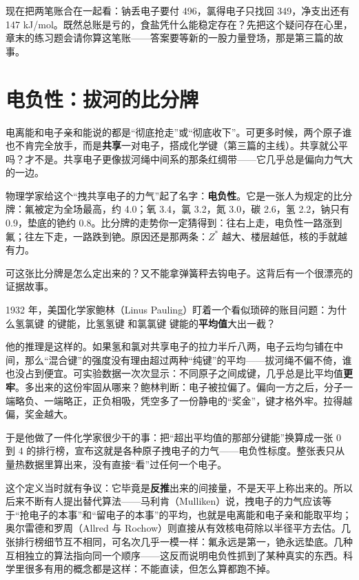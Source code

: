 现在把两笔账合在一起看：钠丢电子要付 496，氯得电子只找回 349，净支出还有 147 kJ/mol。既然总账是亏的，食盐凭什么能稳定存在？先把这个疑问存在心里，章末的练习题会请你算这笔账——答案要等新的一股力量登场，那是第三篇的故事。

\section{电负性：拔河的比分牌}

电离能和电子亲和能说的都是“彻底抢走”或“彻底收下”。可更多时候，两个原子谁也不肯完全放手，而是\textbf{共享}一对电子，搭成化学键（第三篇的主线）。共享就公平吗？才不是。共享电子更像拔河绳中间系的那条红绸带——它几乎总是偏向力气大的一边。

物理学家给这个“拽共享电子的力气”起了名字：\textbf{电负性}。它是一张人为规定的比分牌：氟被定为全场最高，约 4.0；氧 3.4，氯 3.2，氮 3.0，碳 2.6，氢 2.2，钠只有 0.9，垫底的铯约 0.8。比分牌的走势你一定猜得到：往右上走，电负性一路涨到氟；往左下走，一路跌到铯。原因还是那两条：$Z^{*}$ 越大、楼层越低，核的手就越有力。

可这张比分牌是怎么定出来的？又不能拿弹簧秤去钩电子。这背后有一个很漂亮的证据故事。

\begin{zhengju}
1932 年，美国化学家鲍林（Linus Pauling）盯着一个看似琐碎的账目问题：为什么氢氯键  的键能，比氢氢键  和氯氯键  键能的\textbf{平均值}大出一截？

他的推理是这样的。如果氢和氯对共享电子的拉力半斤八两，电子云均匀铺在中间，那么“混合键”的强度没有理由超过两种“纯键”的平均——拔河绳不偏不倚，谁也没占到便宜。可实验数据一次次显示：不同原子之间成键，几乎总是比平均值\textbf{更牢}。多出来的这份牢固从哪来？鲍林判断：电子被拉偏了。偏向一方之后，分子一端略负、一端略正，正负相吸，凭空多了一份静电的“奖金”，键才格外牢。拉得越偏，奖金越大。

于是他做了一件化学家很少干的事：把“超出平均值的那部分键能”换算成一张 0 到 4 的排行榜，宣布这就是各种原子拽电子的力气——电负性标度。整张表只从量热数据里算出来，没有直接“看”过任何一个电子。

这个定义当时就有争议：它毕竟是\textbf{反推}出来的间接量，不是天平上称出来的。所以后来不断有人提出替代算法——马利肯（Mulliken）说，拽电子的力气应该等于“抢电子的本事”和“留电子的本事”的平均，也就是电离能和电子亲和能取平均；奥尔雷德和罗周（Allred 与 Rochow）则直接从有效核电荷除以半径平方去估。几张排行榜细节互不相同，可名次几乎一模一样：氟永远是第一，铯永远垫底。几种互相独立的算法指向同一个顺序——这反而说明电负性抓到了某种真实的东西。科学里很多有用的概念都是这样：不能直读，但怎么算都跑不掉。
\end{zhengju}

